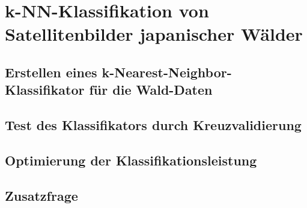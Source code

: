\section{k-NN-Klassifikation von Satellitenbilder japanischer Wälder}

\subsection{Erstellen eines k-Nearest-Neighbor-Klassifikator für die Wald-Daten}

\subsection{Test des Klassifikators durch Kreuzvalidierung}

\subsection{Optimierung der Klassifikationsleistung}

\subsection{Zusatzfrage}